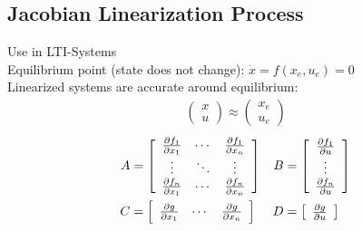 \subsection*{Jacobian Linearization Process}
    Use in LTI-Systems\\
    Equilibrium point (state does not change): $\dot{x} = f(x_e, u_e) = 0$\\
    Linearized systems are accurate around equilibrium:
    \begin{align*}
        \left(
            \begin{array}{c}
                x\\
                u
            \end{array}
        \right)
        \approx
        \left(
            \begin{array}{c}
                x_e\\
                u_e
            \end{array}
        \right)
    \end{align*}
    \begin{align*} %
        A &= 
        \left[\begin{array}{c c c}
            \frac{\partial f_1}{\partial x_1} & \cdots & \frac{\partial f_1}{\partial x_n}\\
            \vdots & \ddots & \vdots\\
            \frac{\partial f_n}{\partial x_1} & \cdots & \frac{\partial f_n}{\partial x_n}
        \end{array}\right]
        &B &= 
        \left[\begin{array}{c}
            \frac{\partial f_1}{\partial u}\\
            \vdots\\
            \frac{\partial f_n}{\partial u}
        \end{array}\right]
        \\
        C &= 
        \left[\begin{array}{c c c}
            \frac{\partial g}{\partial x_1} & \cdots & \frac{\partial g}{\partial x_n}
        \end{array}\right]
        &D &= 
        \left[\begin{array}{c}
            \frac{\partial g}{\partial u}
        \end{array}\right]
    \end{align*}
